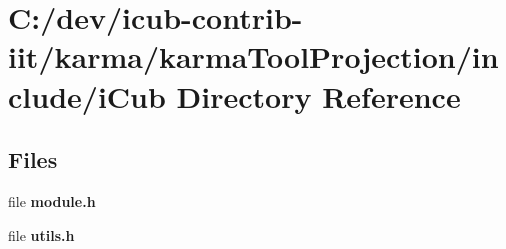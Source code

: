 \section{C\+:/dev/icub-\/contrib-\/iit/karma/karma\+Tool\+Projection/include/i\+Cub Directory Reference}
\label{dir_cd53ebd3e829865424f05673e33cf75a}
\subsection*{Files}
\begin{DoxyCompactItemize}
\item 
file {\bfseries module.\+h}
\item 
file {\bfseries utils.\+h}
\end{DoxyCompactItemize}
